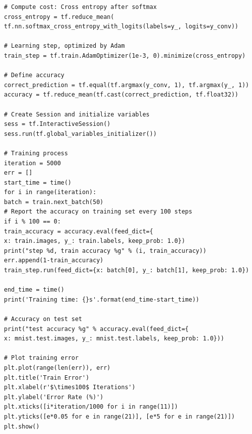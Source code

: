 \documentclass{article}
\begin{document}
\begin{lstlisting}
# Compute cost: Cross entropy after softmax
cross_entropy = tf.reduce_mean(
tf.nn.softmax_cross_entropy_with_logits(labels=y_, logits=y_conv))

# Learning step, optimized by Adam
train_step = tf.train.AdamOptimizer(1e-3, 0).minimize(cross_entropy)

# Define accuracy
correct_prediction = tf.equal(tf.argmax(y_conv, 1), tf.argmax(y_, 1))
accuracy = tf.reduce_mean(tf.cast(correct_prediction, tf.float32))

# Create Session and initialize variables
sess = tf.InteractiveSession()
sess.run(tf.global_variables_initializer())

# Training process
iteration = 5000
err = []
start_time = time()
for i in range(iteration):
batch = train.next_batch(50)
# Report the accuracy on training set every 100 steps
if i % 100 == 0:
train_accuracy = accuracy.eval(feed_dict={
x: train.images, y_: train.labels, keep_prob: 1.0})
print("step %d, train accuracy %g" % (i, train_accuracy))
err.append(1-train_accuracy)
train_step.run(feed_dict={x: batch[0], y_: batch[1], keep_prob: 1.0})

end_time = time()
print('Training time: {}s'.format(end_time-start_time))

# Accuracy on test set
print("test accuracy %g" % accuracy.eval(feed_dict={
x: mnist.test.images, y_: mnist.test.labels, keep_prob: 1.0}))

# Plot training error
plt.plot(range(len(err)), err)
plt.title('Train Error')
plt.xlabel(r'$\times100$ Iterations')
plt.ylabel('Error Rate (%)')
plt.xticks([i*iteration/1000 for i in range(11)])
plt.yticks([e*0.05 for e in range(21)], [e*5 for e in range(21)])
plt.show()

\end{lstlisting}
\end{document}
